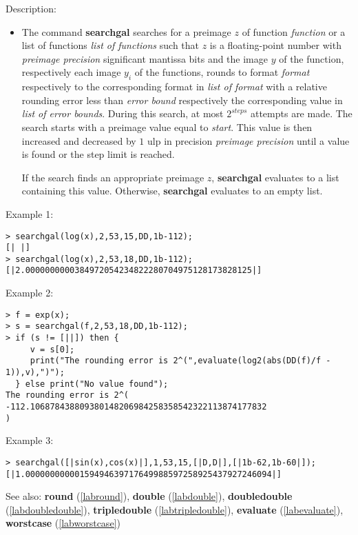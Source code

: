 \noindent Description: \begin{itemize}

\item The command \textbf{searchgal} searches for a preimage $z$ of function
   \emph{function} or a list of functions \emph{list of functions} such that
   $z$ is a floating-point number with \emph{preimage precision}
   significant mantissa bits and the image $y$ of the function,
   respectively each image $y_i$ of the functions, rounds to
   format \emph{format} respectively to the corresponding format in \emph{list of format} 
   with a relative rounding error less than \emph{error bound}
   respectively the corresponding value in \emph{list of error bounds}. During
   this search, at most $2^{steps}$ attempts are made. The search
   starts with a preimage value equal to \emph{start}. This value is then
   increased and decreased by $1$ ulp in precision \emph{preimage precision} 
   until a value is found or the step limit is reached.
    
   If the search finds an appropriate preimage $z$, \textbf{searchgal}
   evaluates to a list containing this value. Otherwise, \textbf{searchgal}
   evaluates to an empty list.
\end{itemize}
\noindent Example 1: 
\begin{center}\begin{minipage}{15cm}\begin{Verbatim}[frame=single,commandchars=\\\|\~]
> searchgal(log(x),2,53,15,DD,1b-112);
[| |]
> searchgal(log(x),2,53,18,DD,1b-112);
[|2.0000000000384972054234822280704975128173828125|]
\end{Verbatim}
\end{minipage}\end{center}
\noindent Example 2: 
\begin{center}\begin{minipage}{15cm}\begin{Verbatim}[frame=single,commandchars=\\\|\~]
> f = exp(x);
> s = searchgal(f,2,53,18,DD,1b-112);
> if (s != [||]) then {
     v = s[0];
     print("The rounding error is 2^(",evaluate(log2(abs(DD(f)/f - 1)),v),")");
  } else print("No value found");
The rounding error is 2^( -112.106878438809380148206984258358542322113874177832 
)
\end{Verbatim}
\end{minipage}\end{center}
\noindent Example 3: 
\begin{center}\begin{minipage}{15cm}\begin{Verbatim}[frame=single,commandchars=\\\|\~]
> searchgal([|sin(x),cos(x)|],1,53,15,[|D,D|],[|1b-62,1b-60|]);
[|1.00000000000159494639717649988597258925437927246094|]
\end{Verbatim}
\end{minipage}\end{center}
See also: \textbf{round} (\ref{labround}), \textbf{double} (\ref{labdouble}), \textbf{doubledouble} (\ref{labdoubledouble}), \textbf{tripledouble} (\ref{labtripledouble}), \textbf{evaluate} (\ref{labevaluate}), \textbf{worstcase} (\ref{labworstcase})
